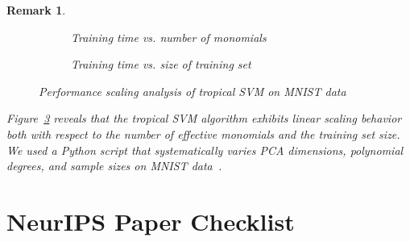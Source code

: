 \documentclass{article}
\newtheorem{remark}{Remark}
\begin{document}
\begin{remark}
\begin{figure}[htbp]
    \centering
    \begin{subfigure}{0.48\textwidth}
        \centering
        \resizebox{0.95\textwidth}{!}{}
        \caption{Training time vs. number of monomials}
        \label{fig:pca_degree_scaling}
    \end{subfigure}
    \hfill  %
    \begin{subfigure}{0.48\textwidth}
        \centering
        \resizebox{0.95\textwidth}{!}{}
        \caption{Training time vs. size of training set}
        \label{fig:sample_size_scaling}
    \end{subfigure}
    \caption{Performance scaling analysis of tropical SVM on MNIST data}
    \label{fig:scaling_analysis}
\end{figure}

Figure~\ref{fig:scaling_analysis} reveals that the tropical SVM algorithm exhibits linear scaling behavior both with respect to the number of effective monomials and the training set size. We used a Python script that systematically varies PCA dimensions, polynomial degrees, and sample sizes on MNIST data \cite{MNIST}.

\newpage
\section*{NeurIPS Paper Checklist}

\begin{enumerate}


\end{enumerate}
\end{remark}
\end{document}
